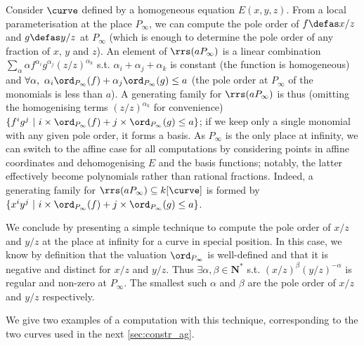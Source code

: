 Consider $\curve$ defined by a homogeneous equation $E(x,y,z)$. From a local parameterisation at the place $P_\infty$, we can compute the pole order of
$f \defas x/z$ and $g \defas y/z$ at $P_\infty$ (which is enough to determine the pole
order of any fraction of $x$, $y$ and $z$).
An element of $\rrs(aP_\infty)$ is a linear combination $\sum_\alpha \alpha f^{\alpha_i}g^{\alpha_j}(z/z)^{\alpha_k}$ s.t. $\alpha_i + \alpha_j + \alpha_k$ is constant (the function is
homogeneous) and $\forall \alpha,~\alpha_i\ord_{P_\infty}(f) + \alpha_j\ord_{P_\infty}(g) \leq a$ (the pole order at $P_\infty$ of the monomials is less
than $a$).
A generating family for $\rrs(aP_\infty)$ is thus (omitting the homogenising terms $(z/z)^{\alpha_k}$ for convenience) $\{f^ig^j~|~i\times\ord_{P_\infty}(f) + j\times\ord_{P_\infty}(g) \leq a\}$; if we keep only a single monomial
with any given pole order, it forms a basis.
As $P_\infty$ is the only place at infinity, we can switch to the affine case for all computations by considering points in affine coordinates and dehomogenising $E$ and the basis functions; notably, the latter effectively become polynomials rather
than rational fractions. Indeed, a generating family
for $\rrs(aP_\infty) \subseteq k[\curve]$ is formed by $\{x^iy^j~|~i\times\ord_{P_\infty}(f) + j\times\ord_{P_\infty}(g) \leq a\}$.

\medskip

We conclude by presenting a simple technique to compute the pole order of $x/z$ and $y/z$ at the place at infinity for a curve in special position.
In this case, we know by definition that the valuation $\ord_{P_\infty}$ is well-defined and that it is negative and distinct for $x/z$ and $y/z$.
Thus $\exists \alpha,\beta \in \mathbf{N}^*$ s.t. $(x/z)^\beta(y/z)^{-\alpha}$ is regular and non-zero at $P_\infty$. The smallest such $\alpha$
and $\beta$ are the pole order of $x/z$ and $y/z$ respectively.

We give two examples of a computation with this technique, corresponding to the two curves used in the next \autoref{sec:constr_ag}.

